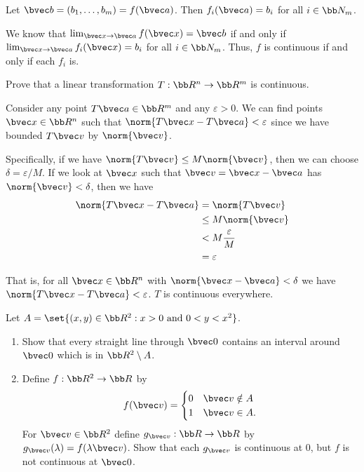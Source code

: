 \documentclass[12pt, letterpaper]{hmcpset}
\begin{document}
\begin{solution}
	Let $\bvec b = (b_1, \ldots, b_m) = f(\bvec a)$. Then $f_i(\bvec a) = b_i$ for all $i \in \bb N_m$.

	We know that $\lim_{\bvec x \to \bvec a} f(\bvec x) = \bvec b$ if and only if $\lim_{\bvec x \to \bvec a} f_i(\bvec x) = b_i$ for all $i \in \bb N_m$. Thus, $f$ is continuous if and only if each $f_i$ is.
\end{solution}

\pagebreak

\begin{problem}[25]
	Prove that a linear transformation $T : \bb R^n \to \bb R^m$ is continuous.
\end{problem}

\begin{solution}
	Consider any point $T \bvec a \in \bb R^m$ and any $\varepsilon > 0$. We can find points $\bvec x \in \bb R^n$ such that $\norm{T \bvec x - T \bvec a} < \varepsilon$ since we have bounded $T \bvec v$ by $\norm{\bvec v}$. 

	Specifically, if we have $\norm{T \bvec v} \le M \norm{\bvec v}$, then we can choose $\delta = \varepsilon/M$. If we look at $\bvec x$ such that $\bvec v = \bvec x - \bvec a$ has $\norm{\bvec v} < \delta$, then we have
	\[
		\begin{split}
			\norm{T \bvec x - T \bvec a} & = \norm{T \bvec v} \\
						     & \le M \norm{\bvec v} \\
						     & < M \frac{\varepsilon}{M} \\
						     & = \varepsilon
		\end{split}
	\]

	That is, for all $\bvec x \in \bb R^n$ with $\norm{\bvec x - \bvec a} < \delta$ we have $\norm{T \bvec x - T \bvec a} < \varepsilon$. $T$ is continuous everywhere.
\end{solution}

\pagebreak

\begin{problem}[26]
	Let $A = \set{(x, y) \in \bb R^2 : x > 0 \text{ and } 0 < y < x^2 }$.
	\begin{enumerate}
		\item Show that every straight line through $\bvec 0$ contains an interval around $\bvec 0$ which is in $\bb R^2 \setminus A$.
		\item Define $f : \bb R^2 \to \bb R$ by
			\[
				f(\bvec v) = \begin{cases}
					0 & \bvec v \notin A \\
					1 & \bvec v \in A.
				\end{cases}
			\]
			For $\bvec v \in \bb R^2$ define $g_{\bvec v} : \bb R \to \bb R$ by $g_{\bvec v}(\lambda) = f(\lambda \bvec v)$. Show that each $g_{\bvec v}$ is continuous at $0$, but $f$ is not continuous at $\bvec 0$.
	\end{enumerate}
\end{problem}
\end{document}
